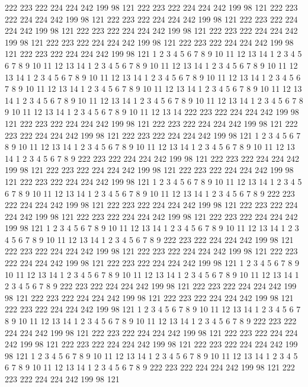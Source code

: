 222 223 222 224 224 242 199 98 121
222 223 222 224 224 242 199 98 121
222 223 222 224 224 242 199 98 121
222 223 222 224 224 242 199 98 121
222 223 222 224 224 242 199 98 121
222 223 222 224 224 242 199 98 121
222 223 222 224 224 242 199 98 121
222 223 222 224 224 242 199 98 121
222 223 222 224 224 242 199 98 121
222 223 222 224 224 242 199 98 121
1 2 3 4 5 6 7 8 9
10 11 12 13 14
1 2 3 4 5 6 7 8 9
10 11 12 13 14
1 2 3 4 5 6 7 8 9
10 11 12 13 14
1 2 3 4 5 6 7 8 9
10 11 12 13 14
1 2 3 4 5 6 7 8 9
10 11 12 13 14
1 2 3 4 5 6 7 8 9
10 11 12 13 14
1 2 3 4 5 6 7 8 9
10 11 12 13 14
1 2 3 4 5 6 7 8 9
10 11 12 13 14
1 2 3 4 5 6 7 8 9
10 11 12 13 14
1 2 3 4 5 6 7 8 9
10 11 12 13 14
1 2 3 4 5 6 7 8 9
10 11 12 13 14
1 2 3 4 5 6 7 8 9
10 11 12 13 14
1 2 3 4 5 6 7 8 9
10 11 12 13 14
222 223 222 224 224 242 199 98 121
222 223 222 224 224 242 199 98 121
222 223 222 224 224 242 199 98 121
222 223 222 224 224 242 199 98 121
222 223 222 224 224 242 199 98 121
1 2 3 4 5 6 7 8 9
10 11 12 13 14
1 2 3 4 5 6 7 8 9
10 11 12 13 14
1 2 3 4 5 6 7 8 9
10 11 12 13 14
1 2 3 4 5 6 7 8 9
222 223 222 224 224 242 199 98 121
222 223 222 224 224 242 199 98 121
222 223 222 224 224 242 199 98 121
222 223 222 224 224 242 199 98 121
222 223 222 224 224 242 199 98 121
1 2 3 4 5 6 7 8 9
10 11 12 13 14
1 2 3 4 5 6 7 8 9
10 11 12 13 14
1 2 3 4 5 6 7 8 9
10 11 12 13 14
1 2 3 4 5 6 7 8 9
222 223 222 224 224 242 199 98 121
222 223 222 224 224 242 199 98 121
222 223 222 224 224 242 199 98 121
222 223 222 224 224 242 199 98 121
222 223 222 224 224 242 199 98 121
1 2 3 4 5 6 7 8 9
10 11 12 13 14
1 2 3 4 5 6 7 8 9
10 11 12 13 14
1 2 3 4 5 6 7 8 9
10 11 12 13 14
1 2 3 4 5 6 7 8 9
222 223 222 224 224 242 199 98 121
222 223 222 224 224 242 199 98 121
222 223 222 224 224 242 199 98 121
222 223 222 224 224 242 199 98 121
222 223 222 224 224 242 199 98 121
1 2 3 4 5 6 7 8 9
10 11 12 13 14
1 2 3 4 5 6 7 8 9
10 11 12 13 14
1 2 3 4 5 6 7 8 9
10 11 12 13 14
1 2 3 4 5 6 7 8 9
222 223 222 224 224 242 199 98 121
222 223 222 224 224 242 199 98 121
222 223 222 224 224 242 199 98 121
222 223 222 224 224 242 199 98 121
222 223 222 224 224 242 199 98 121
1 2 3 4 5 6 7 8 9
10 11 12 13 14
1 2 3 4 5 6 7 8 9
10 11 12 13 14
1 2 3 4 5 6 7 8 9
10 11 12 13 14
1 2 3 4 5 6 7 8 9
222 223 222 224 224 242 199 98 121
222 223 222 224 224 242 199 98 121
222 223 222 224 224 242 199 98 121
222 223 222 224 224 242 199 98 121
222 223 222 224 224 242 199 98 121
1 2 3 4 5 6 7 8 9
10 11 12 13 14
1 2 3 4 5 6 7 8 9
10 11 12 13 14
1 2 3 4 5 6 7 8 9
10 11 12 13 14
1 2 3 4 5 6 7 8 9
222 223 222 224 224 242 199 98 121
222 223 222 224 224 242 199 98 121
